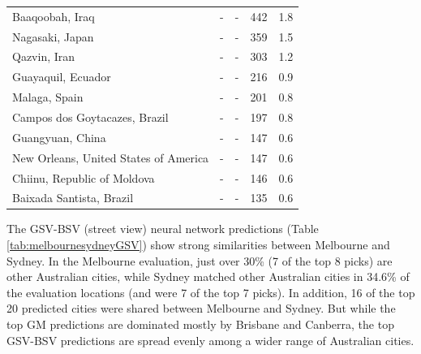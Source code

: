 \documentclass[10pt,letterpaper,hidelinks]{article}
\begin{document}
\begin{table}[!htbp]
\begin{adjustwidth}{-2.25in}{0in}
\begin{tabular}{ l  l l l  l}
Baaqoobah, Iraq &-&- & 442 & 1.8\\ 
Nagasaki, Japan &-&- & 359 & 1.5\\ 
Qazvin, Iran &-&- & 303 & 1.2\\ 
Guayaquil, Ecuador &-&- & 216 & 0.9\\ 
Malaga, Spain &-&- & 201 & 0.8\\ 
Campos dos Goytacazes, Brazil &-&- & 197 & 0.8\\ 
Guangyuan, China &-&- & 147 & 0.6\\ 
New Orleans, United States of America &-&- & 147 & 0.6\\ 
Chiinu, Republic of Moldova &-&- & 146 & 0.6\\ 
Baixada Santista, Brazil &-&- & 135 & 0.6\\ \hline
\end{tabular}
\end{adjustwidth}
\end{table}


The GSV-BSV (street view) neural network predictions (Table \ref{tab:melbournesydneyGSV}) show strong similarities between Melbourne and Sydney. In the Melbourne evaluation, just over 30\% (7 of the top 8 picks) are other Australian cities, while Sydney matched other Australian cities in 34.6\% of the evaluation locations (and were 7 of the top 7 picks). In addition, 16 of the top 20 predicted cities were shared between Melbourne and Sydney. But while the top GM predictions are dominated mostly by Brisbane and Canberra, the top GSV-BSV predictions are spread evenly among a wider range of Australian cities.
\end{document}

